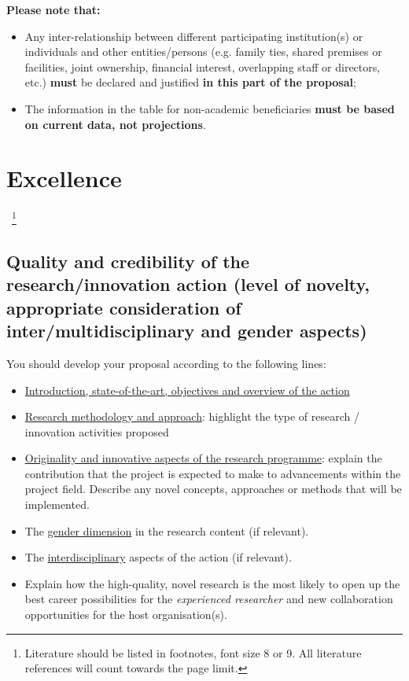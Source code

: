 \noindent
{\bf Please note that:}
\begin{itemize}
  \item Any inter-relationship between different participating institution(s) or individuals and other entities/persons (e.g. family ties, shared premises or facilities, joint ownership, financial interest, overlapping staff or directors, etc.) \textbf{must} be declared and justified \textbf{in this part of the proposal};
  \item The information in the table for non-academic beneficiaries \textbf{must be based on current data, not projections}.
\end{itemize}


\newpage
\markStartPageLimit
\section{Excellence}
\label{sec:excellence}
~\footnote{Literature should be listed in footnotes, font size 8 or 9.
All literature references will count towards the page limit.}

\subsection{Quality and credibility of the research/innovation action (level of novelty, appropriate consideration of inter/multidisciplinary and gender aspects)}
\label{sec:excellence_quality}

You should develop your proposal according to the following lines:
\begin{itemize}
  \item \ul{Introduction, state-of-the-art, objectives and overview of the action}
  \item \ul{Research methodology and approach}: highlight the type of research / innovation activities proposed
  \item \ul{Originality and innovative aspects of the research
  programme}: explain the contribution that the project is
  expected to make to advancements within the project field.
  Describe any novel concepts, approaches or methods that will be
  implemented.
 \item The \ul{gender dimension} in the research content (if
 relevant).

    \bigskip\noindent
    \setlength{\fboxsep}{3mm}
 \item The \ul{interdisciplinary} aspects of the action (if
 relevant).
 \item Explain how the high-quality, novel research is the most
 likely to open up the best career possibilities for the {\em
 experienced researcher} and new collaboration opportunities for
 the host organisation(s).
\end{itemize}


